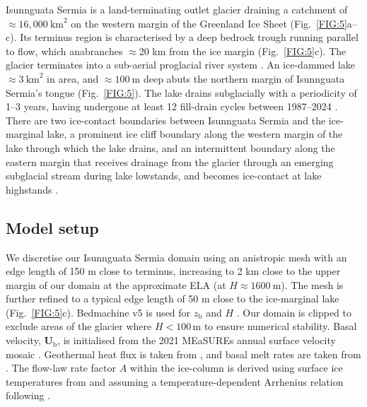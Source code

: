 \documentclass[tc, manuscript]{copernicus}
\begin{document}
Isunnguata Sermia is a land-terminating outlet glacier draining a catchment of $\approx\!16,000\ \mathrm{km}^2$ on the western margin of the Greenland Ice Sheet (Fig.~\ref{FIG:5}a--c). Its terminus region is characterised by a deep bedrock trough running parallel to flow, which anabranches $\approx$20 km from the ice margin (Fig.~\ref{FIG:5}c). The glacier terminates into a sub-aerial proglacial river system \citep{egusphere-2026-2131}. An ice-dammed lake $\approx\!3\ \mathrm{km}^2$ in area, and $\approx\!100\ \mathrm{m}$ deep \citep{livingstone2025ice} abuts the northern margin of Isunnguata Sermia's tongue (Fig.~\ref{FIG:5}). The lake drains subglacially with a periodicity of 1--3 years, having undergone at least 12 fill-drain cycles between 1987--2024 \citep[][Fig.~\ref{FIG:5}g]{livingstone2025ice}. There are two ice-contact boundaries between Isunnguata Sermia and the ice-marginal lake, a prominent ice cliff boundary along the western margin of the lake through which the lake drains, and an intermittent boundary along the eastern margin that receives drainage from the glacier through an emerging subglacial stream during lake lowstands, and becomes ice-contact at lake highstands \citep{livingstone2025ice}.

\subsection{Model setup} \label{application:setup}

We discretise our Isunnguata Sermia domain \citep[derived from][]{lindback2015subglacial} using an anistropic mesh with an edge length of 150 m close to terminus, increasing to 2 km close to the upper margin of our domain at the approximate ELA (at \( H \approx 1600\ \text{m} \)). The mesh is further refined to a typical edge length of 50 m close to the ice-marginal lake (Fig.~\ref{FIG:5}c). Bedmachine v5 is used for $z_{\mathrm{b}}$ and $H$ \citep[][Fig.~\ref{FIG:5}b,c]{morlighem2017bedmachine,Morlighem_Et_Al_2022}. Our domain is clipped to exclude areas of the glacier where $H<100 \, \mathrm{m}$ to ensure numerical stability. Basal velocity, $\mathbf{U}_{\mathrm{b}}$, is initialised from the 2021 MEaSUREs annual surface velocity mosaic \citep{MEASURES}. Geothermal heat flux is taken from \citet{shapiro2004inferring}, and basal melt rates are taken from \citet{karlsson2021first}. The flow-law rate factor $A$ within the ice-column is derived using surface ice temperatures from \citet{ettema2009higher} and assuming a temperature-dependent Arrhenius relation following \citet{cuffey2010physics}. 
\end{document}
